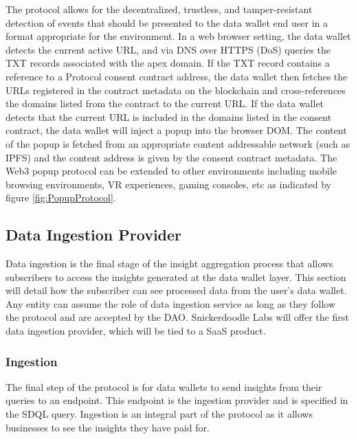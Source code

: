 The protocol allows for the decentralized, trustless, and tamper-resistant detection of events that should be presented to the data wallet 
end user in a format appropriate for the environment. In a web browser setting, the data wallet detects the current active URL, and via DNS 
over HTTPS (DoS) queries the TXT records associated with the apex domain. If the TXT record contains a reference to a Protocol consent 
contract address, the data wallet then fetches the URLs registered in the contract metadata on the blockchain and cross-references the domains 
listed from the contract to the current URL. If the data wallet detects that the current URL is included in the domains listed in the 
consent contract, the data wallet will inject a popup into the browser DOM. The content of the popup is fetched from an appropriate content 
addressable network (such as IPFS) and the content address is given by the consent contract metadata. The Web3 popup protocol can be 
extended to other environments including mobile browsing environments, VR experiences, gaming consoles, etc as indicated by figure \ref{fig:PopupProtocol}. 

\subsection{Data Ingestion Provider} %
Data ingestion is the final stage of the insight aggregation process that allows subscribers to access the insights generated at the data wallet layer. 
This section will detail how the subscriber can see processed data from the user's data wallet. Any entity can assume the role of data ingestion service 
as long as they follow the protocol and are accepted by the DAO. Snickerdoodle Labs will offer the first data ingestion provider, which will be tied to 
a SaaS product. 

\subsubsection{Ingestion}
The final step of the protocol is for data wallets to send insights from their queries to an endpoint. This endpoint is the ingestion provider and is 
specified in the SDQL query. Ingestion is an integral part of the protocol as it allows businesses to see the insights they have paid for.



